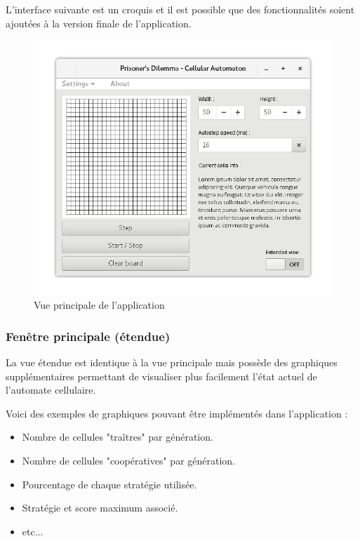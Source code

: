 \documentclass[a4paper, french]{article}
\begin{document}
L'interface suivante est un croquis et il est possible que des fonctionnalités soient ajoutées à la version finale de l'application.

\vfill
\begin{figure}[htp]
    \centering
    \includegraphics[width=14cm]{interface/mainview.png}
    \caption{Vue principale de l'application}
\end{figure}
\vfill

\pagebreak
\subsubsection{Fenêtre principale (étendue)}
La vue étendue est identique à la vue principale mais possède des graphiques supplémentaires permettant de visualiser plus facilement l'état actuel de l'automate cellulaire.

Voici des exemples de graphiques pouvant être implémentés dans l'application : 

\begin{itemize}
    \item Nombre de cellules "traîtres" par génération.
    \item Nombre de cellules "coopératives" par génération.
    \item Pourcentage de chaque stratégie utilisée.
    \item Stratégie et score maximum associé.
    \item etc...
\end{itemize}
\end{document}
